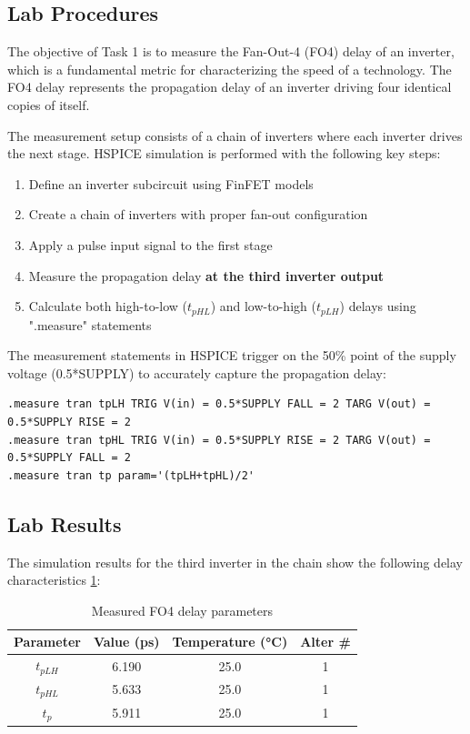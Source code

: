 \documentclass[UTF8,12pt,a4paper]{ctexart}
\begin{document}
\subsection{Lab Procedures}

The objective of Task 1 is to measure the Fan-Out-4 (FO4) delay of an inverter, which is a fundamental metric for characterizing the speed of a technology. The FO4 delay represents the propagation delay of an inverter driving four identical copies of itself.

The measurement setup consists of a chain of inverters where each inverter drives the next stage. HSPICE simulation is performed with the following key steps:

\begin{enumerate}
    \item[1. ] Define an inverter subcircuit using FinFET models
    \item[2. ] Create a chain of inverters with proper fan-out configuration
    \item[3. ] Apply a pulse input signal to the first stage
    \item[4. ] Measure the propagation delay \textbf{at the third inverter output}
    \item[5. ] Calculate both high-to-low ($t_{pHL}$) and low-to-high ($t_{pLH}$) delays using ".measure" statements
\end{enumerate}

The measurement statements in HSPICE trigger on the 50\% point of the supply voltage (0.5*SUPPLY) to accurately capture the propagation delay:

\begin{lstlisting}
.measure tran tpLH TRIG V(in) = 0.5*SUPPLY FALL = 2 TARG V(out) = 0.5*SUPPLY RISE = 2
.measure tran tpHL TRIG V(in) = 0.5*SUPPLY RISE = 2 TARG V(out) = 0.5*SUPPLY FALL = 2
.measure tran tp param='(tpLH+tpHL)/2'
\end{lstlisting}

\subsection{Lab Results}

The simulation results for the third inverter in the chain show the following delay characteristics \ref{tab:task1_results}:

\begin{table}[h]
\centering
\begin{tabular}{cccc}
\toprule
\textbf{Parameter} & \textbf{Value (ps)} & \textbf{Temperature (°C)} & \textbf{Alter \#} \\
\midrule
$t_{pLH}$ & 6.190 & 25.0 & 1 \\

$t_{pHL}$ & 5.633 & 25.0 & 1 \\

$t_p$ & 5.911 & 25.0 & 1 \\
\bottomrule
\end{tabular}
\caption{Measured FO4 delay parameters}
\label{tab:task1_results}
\end{table}
\end{document}
